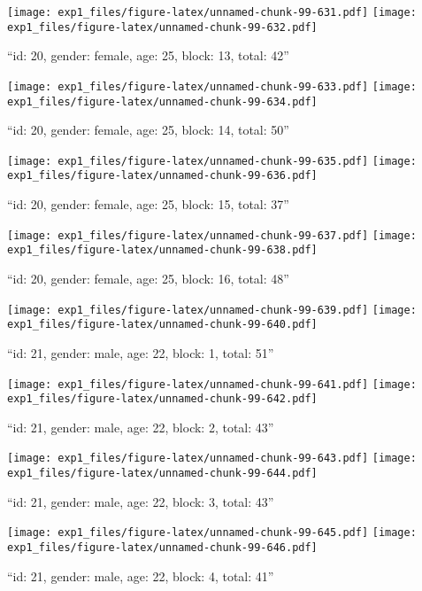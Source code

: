 \documentclass[,]{article}
\begin{document}
\texttt{[image: exp1\_files/figure-latex/unnamed-chunk-99-631.pdf]}
\texttt{[image: exp1\_files/figure-latex/unnamed-chunk-99-632.pdf]}

\newpage
[1] 

``id: 20, gender: female, age: 25, block: 13, total: 42''

\texttt{[image: exp1\_files/figure-latex/unnamed-chunk-99-633.pdf]}
\texttt{[image: exp1\_files/figure-latex/unnamed-chunk-99-634.pdf]}

\newpage
[1] 

``id: 20, gender: female, age: 25, block: 14, total: 50''

\texttt{[image: exp1\_files/figure-latex/unnamed-chunk-99-635.pdf]}
\texttt{[image: exp1\_files/figure-latex/unnamed-chunk-99-636.pdf]}

\newpage
[1] 

``id: 20, gender: female, age: 25, block: 15, total: 37''

\texttt{[image: exp1\_files/figure-latex/unnamed-chunk-99-637.pdf]}
\texttt{[image: exp1\_files/figure-latex/unnamed-chunk-99-638.pdf]}

\newpage
[1] 

``id: 20, gender: female, age: 25, block: 16, total: 48''

\texttt{[image: exp1\_files/figure-latex/unnamed-chunk-99-639.pdf]}
\texttt{[image: exp1\_files/figure-latex/unnamed-chunk-99-640.pdf]}

\newpage
[1] 

``id: 21, gender: male, age: 22, block: 1, total: 51''

\texttt{[image: exp1\_files/figure-latex/unnamed-chunk-99-641.pdf]}
\texttt{[image: exp1\_files/figure-latex/unnamed-chunk-99-642.pdf]}

\newpage
[1] 

``id: 21, gender: male, age: 22, block: 2, total: 43''

\texttt{[image: exp1\_files/figure-latex/unnamed-chunk-99-643.pdf]}
\texttt{[image: exp1\_files/figure-latex/unnamed-chunk-99-644.pdf]}

\newpage
[1] 

``id: 21, gender: male, age: 22, block: 3, total: 43''

\texttt{[image: exp1\_files/figure-latex/unnamed-chunk-99-645.pdf]}
\texttt{[image: exp1\_files/figure-latex/unnamed-chunk-99-646.pdf]}

\newpage
[1] 

``id: 21, gender: male, age: 22, block: 4, total: 41''
\end{document}
